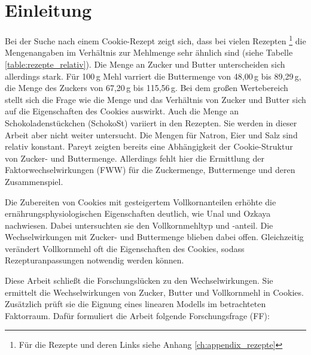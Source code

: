 \chapter{Einleitung} \label{ch:einleitung}

Bei der Suche nach einem Cookie-Rezept zeigt sich, dass bei vielen Rezepten \footnote{Für die Rezepte und deren Links siehe Anhang \ref{ch:appendix_rezepte}} 
die Mengenangaben im Verhältnis zur Mehlmenge sehr ähnlich sind (siehe Tabelle \ref{table:rezepte_relativ}).
Die Menge an Zucker und Butter unterscheiden sich allerdings stark.
Für 100\,g Mehl varriert die Buttermenge von 48,00\,g bis 89,29\,g,
die Menge des Zuckers von 67,20\,g bis 115,56\,g.
Bei dem großen Wertebereich stellt sich die Frage wie die Menge und das Verhältnis von Zucker und Butter sich auf die Eigenschaften des Cookies auswirkt.
Auch die Menge an Schokoladenstückchen (SchokoSt) variiert in den Rezepten.
Sie werden in dieser Arbeit aber nicht weiter untersucht.
Die Mengen für Natron, Eier und Salz sind relativ konstant.
Pareyt \etal \cite{pareyt2009role} zeigten bereits eine Abhängigkeit der Cookie-Struktur von Zucker- und Buttermenge.
Allerdings fehlt hier die Ermittlung der Faktorwechselwirkungen (FWW) für die Zuckermenge, Buttermenge und deren Zusammenspiel.



Die Zubereiten von Cookies mit gesteigertem Vollkornanteilen erhöhte die ernährungsphysiologischen Eigenschaften deutlich, wie Unal und Ozkaya \cite{arslan2024nutritional} nachwiesen.
Dabei untersuchten sie den Vollkornmehltyp und -anteil.
Die Wechselwirkungen mit Zucker- und Buttermenge blieben dabei offen.
Gleichzeitig verändert Vollkornmehl oft die Eigenschaften des Cookies, sodass Rezepturanpassungen notwendig werden können.

Diese Arbeit schließt die Forschungslücken zu den Wechselwirkungen.
Sie ermittelt die Wechselwirkungen von Zucker, Butter und Vollkornmehl in Cookies.
Zusätzlich prüft sie die Eignung eines linearen Modells im betrachteten Faktorraum.
Dafür formuliert die Arbeit folgende Forschungsfrage (FF):

